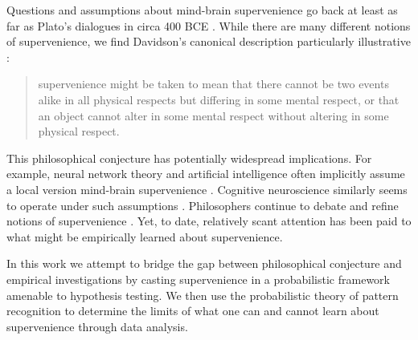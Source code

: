 \documentclass{article}
\begin{document}

\newpage

\noindent Questions and assumptions about mind-brain supervenience go back at least as far as Plato's dialogues in circa 400 BCE \cite{Plato97}.  While there are many different notions of supervenience, we find Davidson's canonical description particularly illustrative \cite{Davidson70}:
\begin{quotation}
 supervenience might be taken to mean that there cannot be two events alike in all physical respects but differing in some mental respect, or that an object cannot alter in some mental respect without altering in some physical respect.
\end{quotation}
This philosophical conjecture has potentially widespread implications.  
For example, neural network theory and artificial intelligence often implicitly assume 
a local version mind-brain supervenience 
\cite{Haykin2008,Ripley2008}. Cognitive neuroscience similarly seems to operate under such assumptions
\cite{Gazzaniga2008}.  Philosophers continue to debate and refine notions of supervenience 
\cite{Kim2007}.  
Yet, to date, relatively scant attention has been paid to what might be empirically learned about supervenience.  

In this work we attempt to bridge the gap between philosophical conjecture and empirical investigations by casting supervenience in a probabilistic framework amenable to hypothesis testing. 
We then use the probabilistic theory of pattern recognition to determine
the limits of what one can and cannot learn about supervenience through data analysis.  
\end{document}
